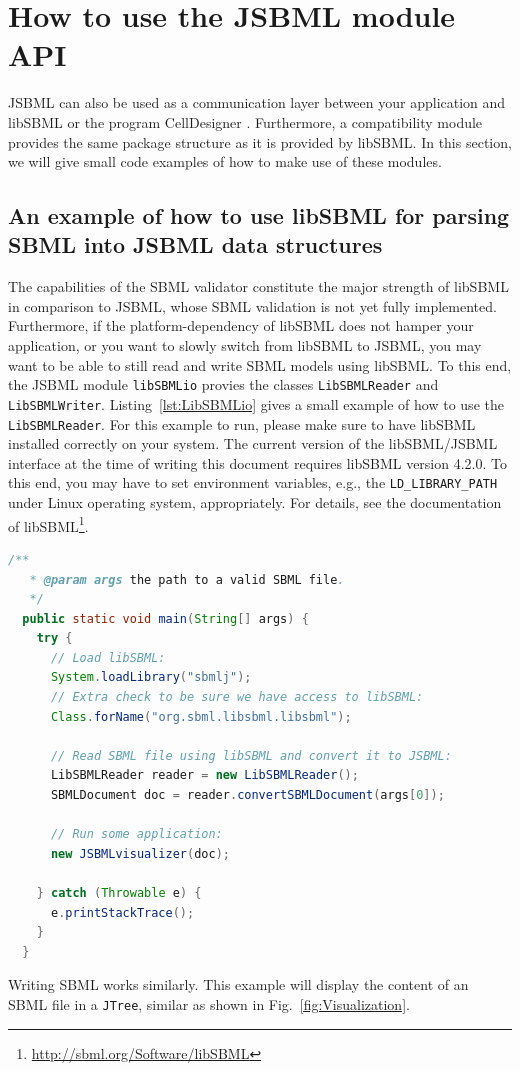 \documentclass[
  BCOR12mm,
  letterpaper,
  11pt,
  headsepline,
  pointlessnumbers,
  tablecaptionabove,
  onelinecaption,
  headinclude,
  appendixprefix,
  idxtotoc,
  bibtotoc,
  twoside,
  titlepage
]{scrartcl}
\begin{document}
\section{How to use the JSBML module API}

JSBML can also be used as a communication layer
 between your application and libSBML
\citep{Bornstein2008} or the program CellDesigner \citep{Funahashi2003}.
Furthermore, a compatibility module provides the same package structure as it is
provided by libSBML. In this section, we will give small code examples of how to
make use of these modules.

\subsection{An example of how to use libSBML for parsing SBML into JSBML data
structures}

The capabilities of the SBML validator constitute the
major strength of libSBML \citep{Bornstein2008} in comparison to JSBML, whose
SBML validation is not yet fully implemented. Furthermore, if the
platform-dependency of libSBML does not hamper your application, or you want to
slowly switch from libSBML to JSBML, you may want to be able to still read and
write SBML models using libSBML. To this end, the JSBML module
\texttt{libSBMLio} provies the classes \texttt{LibSBMLReader}
 and
\texttt{LibSBMLWriter}.
Listing~\vref{lst:LibSBMLio} gives a small example of how to use the
\texttt{LibSBMLReader}. For this example to run, please make sure to have
libSBML installed correctly on your system. The current version of the
libSBML/JSBML interface at the time of writing this document requires libSBML
version 4.2.0.
To this end, you may have to set environment variables, e.g., the
\texttt{LD\_LIBRARY\_PATH} under Linux
operating system, appropriately. For details, see the
documentation of libSBML\footnote{\url{http://sbml.org/Software/libSBML}}.
\begin{lstlisting}[language=Java,float,caption={A simple example for a
converting libSBML data structures into JSBML data objects},label=lst:LibSBMLio]
  /**
   * @param args the path to a valid SBML file.
   */
  public static void main(String[] args) {
    try {
      // Load libSBML:
      System.loadLibrary("sbmlj");
      // Extra check to be sure we have access to libSBML:
      Class.forName("org.sbml.libsbml.libsbml");

      // Read SBML file using libSBML and convert it to JSBML:
      LibSBMLReader reader = new LibSBMLReader();
      SBMLDocument doc = reader.convertSBMLDocument(args[0]);

      // Run some application:
      new JSBMLvisualizer(doc);

    } catch (Throwable e) {
      e.printStackTrace();
    }
  }
\end{lstlisting}
Writing SBML works similarly. This example will display the content of an SBML
file in a \texttt{JTree}, similar as shown in Fig.~\vref{fig:Visualization}.
\end{document}

